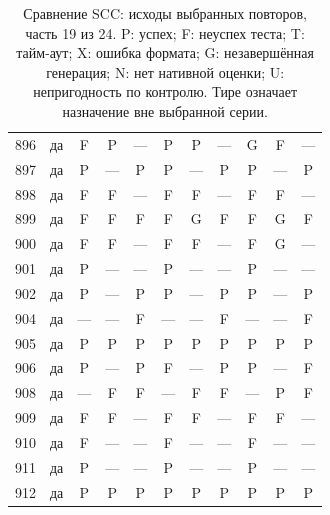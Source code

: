 \begin{table}[p]
\begin{tabular*}{\textwidth}{@{\extracolsep{\fill}}rc*{9}{c}@{}}
896 & да & F & P & — & P & P & — & G & F & —\\
897 & да & P & — & P & P & — & P & P & — & P\\
898 & да & F & F & — & F & F & — & F & F & —\\
899 & да & F & F & F & F & G & F & F & G & F\\
900 & да & F & F & — & F & F & — & F & G & —\\
901 & да & P & — & — & P & — & — & P & — & —\\
902 & да & P & — & P & P & — & P & P & — & P\\
904 & да & — & — & F & — & — & F & — & — & F\\
905 & да & P & P & P & P & P & P & P & P & P\\
906 & да & P & — & P & F & — & P & P & — & F\\
908 & да & — & F & F & — & F & F & — & P & F\\
909 & да & F & F & — & F & F & — & F & F & —\\
910 & да & F & — & — & F & — & — & F & — & —\\
911 & да & P & — & — & P & — & — & P & — & —\\
912 & да & P & P & P & P & P & P & P & P & P\\
\bottomrule\end{tabular*}
\caption{Сравнение SCC: исходы выбранных повторов, часть 19 из 24. P: успех; F: неуспех теста; T: тайм-аут; X: ошибка формата; G: незавершённая генерация; N: нет нативной оценки; U: непригодность по контролю. Тире означает назначение вне выбранной серии.}
\end{table}
\clearpage
